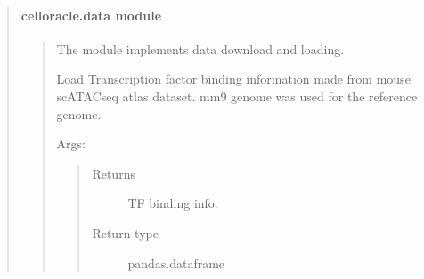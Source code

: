 \documentclass[letterpaper,10pt,english]{sphinxmanual}
\begin{document}
\begin{quote}
\begin{quote}
\begin{fulllineitems}
\label{\detokenize{modules/celloracle.utility:celloracle.utility.update_adata}}
\end{fulllineitems}

\end{quote}


\paragraph{celloracle.data module}
\label{\detokenize{modules/celloracle.data:celloracle-data-module}}\label{\detokenize{modules/celloracle.data::doc}}\begin{quote}
\label{\detokenize{modules/celloracle.data:module-celloracle.data}}
The {\hyperref[\detokenize{modules/celloracle.data:module-celloracle.data}]{}} module implements data download and loading.

\begin{fulllineitems}
\label{\detokenize{modules/celloracle.data:celloracle.data.load_TFinfo_df_mm9_mouse_atac_atlas}}
Load Transcription factor binding information made from mouse scATAC\sphinxhyphen{}seq atlas dataset.
mm9 genome was used for the reference genome.

Args:
\begin{quote}\begin{description}
\item[{Returns}] \leavevmode
TF binding info.

\item[{Return type}] \leavevmode
pandas.dataframe

\end{description}\end{quote}

\end{fulllineitems}


\end{quote}
\end{quote}
\end{document}
